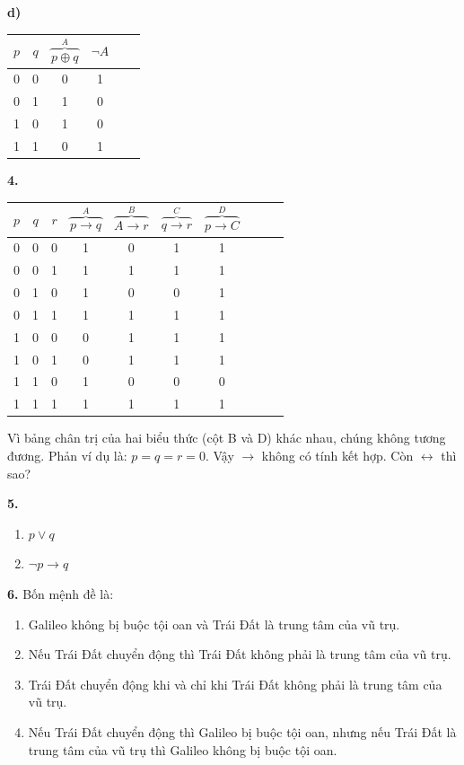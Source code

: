 \documentclass[12pt,a4paper]{article}
\theoremstyle{definition}
\begin{document}
\textbf{d)}
\begin{center}
\begin{tabular}{cc|cccc}
$p$ & $q$ & $\overbrace{p \oplus q}^{A}$ & $\neg A$ \\
\hline
0 & 0 & 0 & 1 \\
0 & 1 & 1 & 0 \\
1 & 0 & 1 & 0 \\
1 & 1 & 0 & 1
\end{tabular}
\end{center}

\bigskip
\textbf{4.}
\begin{center}
\begin{tabular}{ccc|ccccccc}
$p$ & $q$ & $r$ & $\overbrace{p \to q}^{A}$ & $\overbrace{A \to r}^{B}$ & $\overbrace{q \to r}^{C}$ & $\overbrace{p \to C}^{D}$ \\
\hline
0 & 0 & 0 & 1 & 0 & 1 & 1 \\
0 & 0 & 1 & 1 & 1 & 1 & 1 \\
0 & 1 & 0 & 1 & 0 & 0 & 1 \\
0 & 1 & 1 & 1 & 1 & 1 & 1 \\
1 & 0 & 0 & 0 & 1 & 1 & 1 \\
1 & 0 & 1 & 0 & 1 & 1 & 1 \\
1 & 1 & 0 & 1 & 0 & 0 & 0 \\
1 & 1 & 1 & 1 & 1 & 1 & 1
\end{tabular}
\end{center}

Vì bảng chân trị của hai biểu thức (cột B và D) khác nhau, chúng không tương đương. Phản ví dụ là: $p = q = r = 0$. Vậy $\to$ không có tính kết hợp.
Còn $\leftrightarrow$ thì sao?

\bigskip
\textbf{5.}
\begin{enumerate}[label=\textbf{\alph*)}]
\item $p \lor q$
\item $\neg p \to q$
\end{enumerate}

\bigskip
\textbf{6.} Bốn mệnh đề là:
\begin{enumerate}[label=\textbf{\alph*)}]
\item Galileo không bị buộc tội oan và Trái Đất là trung tâm của vũ trụ.
\item Nếu Trái Đất chuyển động thì Trái Đất không phải là trung tâm của vũ trụ.
\item Trái Đất chuyển động khi và chỉ khi Trái Đất không phải là trung tâm của vũ trụ.
\item Nếu Trái Đất chuyển động thì Galileo bị buộc tội oan, nhưng nếu Trái Đất là trung tâm của vũ trụ thì Galileo không bị buộc tội oan.
\end{enumerate}
\end{document}
